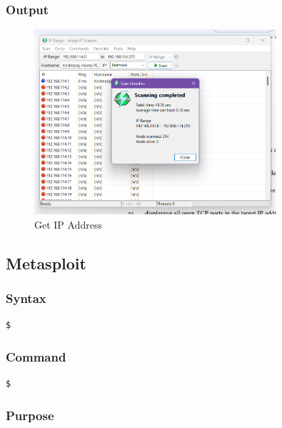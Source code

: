 \documentclass[11pt]{article}
\begin{document}
\subsubsection*{Output}
\begin{figure}[H]
    \centering
    \includegraphics[width=0.8\textwidth]{angryip.png}
    \caption{Get IP Address}
    \label{fig:1}
\end{figure}

\subsection{Metasploit}

\subsubsection*{Syntax}
\begin{verbatim}
$
\end{verbatim}

\subsubsection*{Command}
\begin{verbatim}
$
\end{verbatim}

\subsubsection*{Purpose}
\end{document}
